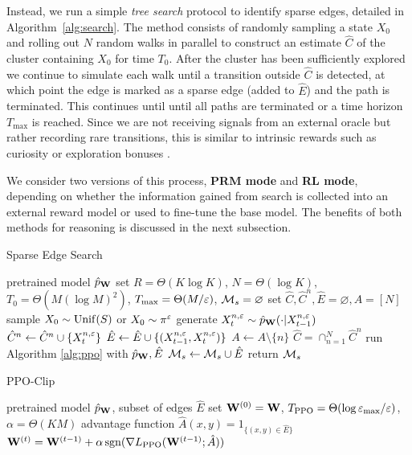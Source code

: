 Instead, we run a simple \textit{tree search} protocol to identify sparse edges, detailed in Algorithm~\ref{alg:search}. The method consists of randomly sampling a state $X_0$ and rolling out $N$ random walks in parallel to construct an estimate $\hat{C}$ of the cluster containing $X_0$ for time $T_0$. After the cluster has been sufficiently explored we continue to simulate each walk until a transition outside $\hat{C}$ is detected, at which point the edge is marked as a sparse edge (added to $\hat{E}$) and the path is terminated. This continues until until all paths are terminated or a time horizon $T_{\max}$ is reached. Since we are not receiving signals from an external oracle but rather recording rare transitions, this is similar to intrinsic rewards such as curiosity or exploration bonuses \citep{Burda18,Burda19}.

We consider two versions of this process, \textbf{PRM mode} and \textbf{RL mode}, depending on whether the information gained from search is collected into an external reward model or used to fine-tune the base model. The benefits of both methods for reasoning is discussed in the next subsection.


\begin{algorithm}[t]
\caption{Sparse Edge Search}
\label{alg:search}
\begin{algorithmic}[1]
\REQUIRE pretrained model $\hat{p}_{\mathbf{W}}$
\STATE set $R=\Theta(K\log K)$, $N=\Theta(\log K)$,\\ $T_0=\Theta(M(\log M)^2)$, $T_{\max}=\Theta(M/\varepsilon)$, $\mathcal{M}_s = \varnothing$
\STATE set $\hat{C},\hat{C}^n,\hat{E}=\varnothing, A=[N]$
\STATE sample $X_0\sim \operatorname{Unif}(S)$ or $X_0\sim\pi^\varepsilon$
\STATE generate $X_t^{n,\varepsilon} \sim \hat{p}_{\mathbf{W}}(\cdot |X_{t-1}^{n,\varepsilon})$
\STATE $\hat{C}^n\gets \hat{C}^n\cup\{X_t^{n,\varepsilon}\}$
\STATE $\hat{E}\gets\hat{E}\cup\{(X_{t-1}^{n,\varepsilon},X_t^{n,\varepsilon})\}$
\STATE $A\gets A\setminus\{n\}$
\ENDIF
\ENDFOR
{}
\STATE $\hat{C}= \cap_{n=1}^N \hat{C}^n$
\ENDIF
\ENDFOR
\STATE run Algorithm \ref{alg:ppo} with $\hat{p}_{\mathbf{W}},\hat{E}$  
\STATE $\mathcal{M}_s\gets\mathcal{M}_s\cup\hat{E}$ 
\ENDFOR
\STATE return $\mathcal{M}_s$

\end{algorithmic}
\end{algorithm}


\begin{algorithm}[t]
\caption{PPO-Clip}
\label{alg:ppo}
\begin{algorithmic}[1]
\REQUIRE pretrained model $\hat{p}_{\mathbf{W}}$, subset of edges $\hat{E}$
\STATE set $\mathbf{W}^{(0)}=\mathbf{W}$, $T_{\operatorname{PPO}} = \Theta(\log\varepsilon_{\max}/\varepsilon)$, $\alpha=\Theta(KM)$
\STATE advantage function $\hat{A}(x,y) = 1_{\{(x,y)\in\hat{E}\}}$
\STATE $\mathbf{W}^{(t)} = \mathbf{W}^{(t-1)} + \alpha\operatorname{sgn}(\nabla L_{\operatorname{PPO}}(\mathbf{W}^{(t-1)};\hat{A}))$
\ENDFOR
\end{algorithmic}
\end{algorithm}


